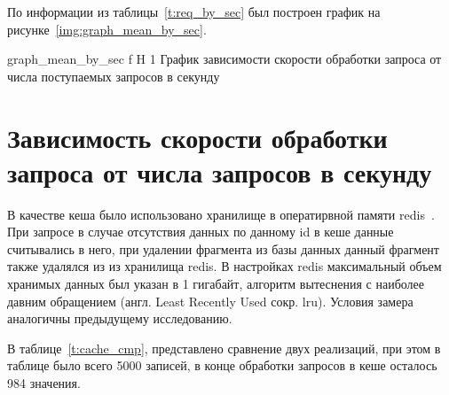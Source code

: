 По информации из таблицы~\ref{t:req_by_sec} был построен график на рисунке~\ref{img:graph_mean_by_sec}.

{graph_mean_by_sec} %
{f} %
{H} %
{1\textwidth} %
{График зависимости скорости обработки запроса от числа поступаемых запросов в секунду} %


\section{Зависимость скорости обработки запроса от числа запросов в секунду}
В качестве кеша было использовано хранилище в оператирвной памяти redis~\cite{redis}. При запросе в случае отсутствия данных по данному id в кеше данные считывались в него, при удалении фрагмента из базы данных данный фрагмент также удалялся из из хранилища redis. В настройках redis максимальный объем хранимых данных был указан в 1 гигабайт, алгоритм вытеснения с наиболее давним обращением (англ. Least Recently Used сокр. lru). Условия замера аналогичны предыдущему исследованию.


В таблице~\ref{t:cache_cmp}, представлено сравнение двух реализаций, при этом в таблице было всего 5000 записей, в конце обработки запросов в кеше осталось 984 значения.

